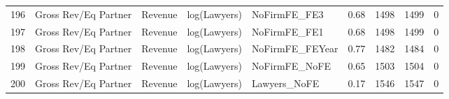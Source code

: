 \begin{table}[ht]
\begin{tabular}{rllllllll}
  196 & Gross Rev/Eq Partner & Revenue & log(Lawyers) & NoFirmFE\_FE3 & 0.68 & 1498 & 1499 & 0 \\ 
  197 & Gross Rev/Eq Partner & Revenue & log(Lawyers) & NoFirmFE\_FE1 & 0.68 & 1498 & 1499 & 0 \\ 
  198 & Gross Rev/Eq Partner & Revenue & log(Lawyers) & NoFirmFE\_FEYear & 0.77 & 1482 & 1484 & 0 \\ 
  199 & Gross Rev/Eq Partner & Revenue & log(Lawyers) & NoFirmFE\_NoFE & 0.65 & 1503 & 1504 & 0 \\ 
  200 & Gross Rev/Eq Partner & Revenue & log(Lawyers) & Lawyers\_NoFE & 0.17 & 1546 & 1547 & 0 \\ 
   \hline
\end{tabular}
\end{table}
